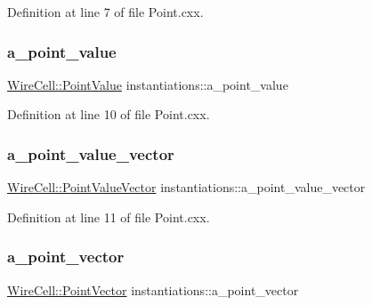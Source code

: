 Definition at line 7 of file Point.\+cxx.

\mbox{\label{namespaceinstantiations_aa6d86dbe5d338ebdad397bc5e2378652}} 
\subsubsection{\texorpdfstring{a\+\_\+point\+\_\+value}{a\_point\_value}}
{\footnotesize\ttfamily \hyperlink{namespace_wire_cell_abc1e159db6ef5d9b40f5aab6bd93352f}{Wire\+Cell\+::\+Point\+Value} instantiations\+::a\+\_\+point\+\_\+value}



Definition at line 10 of file Point.\+cxx.

\mbox{\label{namespaceinstantiations_a8265893c3533adc3c9884fa50fecee4d}} 
\subsubsection{\texorpdfstring{a\+\_\+point\+\_\+value\+\_\+vector}{a\_point\_value\_vector}}
{\footnotesize\ttfamily \hyperlink{namespace_wire_cell_a9cdf8eab5ec63490f0328e5ab18219de}{Wire\+Cell\+::\+Point\+Value\+Vector} instantiations\+::a\+\_\+point\+\_\+value\+\_\+vector}



Definition at line 11 of file Point.\+cxx.

\mbox{\label{namespaceinstantiations_af631e8b8f75785ba4b2fa3935618a0ea}} 
\subsubsection{\texorpdfstring{a\+\_\+point\+\_\+vector}{a\_point\_vector}}
{\footnotesize\ttfamily \hyperlink{namespace_wire_cell_a702d686b1b45c19eed6654d1d5ef8c7b}{Wire\+Cell\+::\+Point\+Vector} instantiations\+::a\+\_\+point\+\_\+vector}



